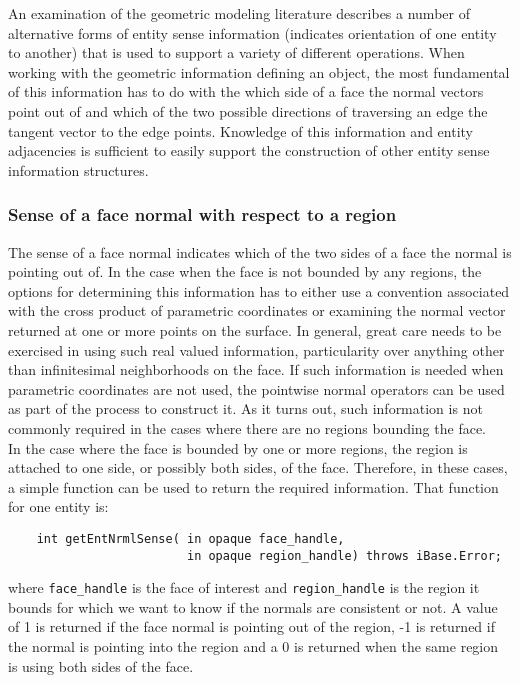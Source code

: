 \documentclass{article}
\begin{document}
An examination of the geometric modeling literature describes 
a number of alternative forms of entity sense information (indicates 
orientation of one entity to another) that is used to support 
a variety of different operations. When working with the geometric 
information defining an object, the most fundamental of this 
information has to do with the which side of a face the normal 
vectors point out of and which of the two possible directions 
of traversing an edge the tangent vector to the edge points. 
Knowledge of this information and entity adjacencies is sufficient 
to easily support the construction of other entity sense information 
structures.


\subsubsection{Sense of a face normal with respect to a region}

The sense of a face normal indicates which of the two sides 
of a face the normal is pointing out of. In the case when the 
face is not bounded by any regions, the options for determining 
this information has to either use a convention associated with 
the cross product of parametric coordinates or examining the 
normal vector returned at one or more points on the surface. 
In general, great care needs to be exercised in using such real 
valued information, particularity over anything other than infinitesimal 
neighborhoods on the face. If such information is needed when 
parametric coordinates are not used, the pointwise normal operators 
can be used as part of the process to construct it. As it turns 
out, such information is not commonly required in the cases where 
there are no regions bounding the face.\\


In the case where the face is bounded by one or more regions, 
the region is attached to one side, or possibly both sides, of 
the face. Therefore, in these cases, a simple function can be 
used to return the required information. That function for one 
entity is:

\begin{verbatim}
    int getEntNrmlSense( in opaque face_handle, 
                         in opaque region_handle) throws iBase.Error;
\end{verbatim}
where {\tt face\_handle} is the face of interest and {\tt region\_handle} is 
the region it bounds for which we want to know if the normals 
are consistent or not. A value of 1 is returned if the face normal 
is pointing out of the region, -1 is returned if the normal is 
pointing into the region and a 0 is returned when the same region 
is using both sides of the face.\\
\end{document}
